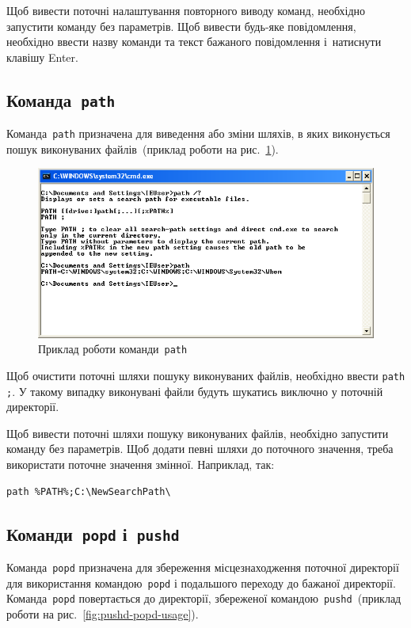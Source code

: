 \documentclass[
	a4paper,
	oneside,
	DIV = 12,
	fontsize = 13pt,
	headings = normal,
]{scrartcl}
\newcommand{\progname}[1]{\texttt{#1}}
\begin{document}
			Щоб вивести поточні налаштування повторного виводу команд, необхідно запустити команду без параметрів. Щоб вивести будь-яке повідомлення, необхідно ввести назву команди та текст бажаного повідомлення і~натиснути клавішу \textenglish{Enter}. 

		\subsection{Команда~\progname{path}}
			Команда~\progname{path} призначена для виведення або зміни шляхів, в яких виконується пошук виконуваних файлів~(приклад роботи на рис.~\ref{fig:path-usage}).

			\begin{figure}[!htbp]
				\centering
				\includegraphics[height = 6\baselineskip]{../01-solution/y03s01-pcdiag-lab-06-p03.png}
				\caption{Приклад роботи команди~\progname{path}}
				\label{fig:path-usage}
			\end{figure}

			Щоб очистити поточні шляхи пошуку виконуваних файлів, необхідно ввести \verb|path ;|. У такому випадку виконувані файли будуть шукатись виключно у поточній директорії.

			Щоб вивести поточні шляхи пошуку виконуваних файлів, необхідно запустити команду без параметрів. Щоб додати певні шляхи до поточного значення, треба використати поточне значення змінної. Наприклад, так:
			\begin{verbatim}
path %PATH%;C:\NewSearchPath\
			\end{verbatim}

		\subsection{Команди~\progname{popd} і~\progname{pushd}}
			Команда~\progname{popd} призначена для збереження місцезнаходження поточної директорії для використання командою~\progname{popd} і подальшого переходу до бажаної директорії. Команда~\progname{popd} повертається до директорії, збереженої командою~\progname{pushd}~(приклад роботи на рис.~\ref{fig:pushd-popd-usage}).
\end{document}
